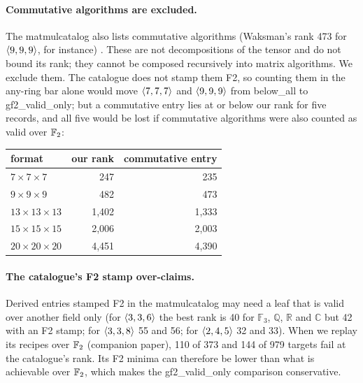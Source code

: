 \paragraph{Commutative algorithms are excluded.}
The matmulcatalog also lists commutative algorithms (Waksman's rank 473 for $\langle 9,9,9\rangle$, for instance) \cite{waksman1970winograd,winograd1968inner}. These are not decompositions of the tensor and do not bound its rank; they cannot be composed recursively into matrix algorithms. We exclude them. The catalogue does not stamp them F2, so counting them in the any-ring bar alone would move $\langle 7,7,7\rangle$ and $\langle 9,9,9\rangle$ from \textsf{below\_all} to \textsf{gf2\_valid\_only}; but a commutative entry lies at or below our rank for five records, and all five would be lost if commutative algorithms were also counted as valid over ${\mathbb{F}_2}$:
\begin{center}\small
\begin{tabular}{@{}lrr@{}}
\toprule
format & our rank & commutative entry\\\midrule
$7\times7\times7$ & 247 & 235\\
$9\times9\times9$ & 482 & 473\\
$13\times13\times13$ & 1{,}402 & 1{,}333\\
$15\times15\times15$ & 2{,}006 & 2{,}003\\
$20\times20\times20$ & 4{,}451 & 4{,}390\\
\bottomrule
\end{tabular}
\end{center}

\paragraph{The catalogue's F2 stamp over-claims.}
Derived entries stamped F2 in the matmulcatalog may need a leaf that is valid over another field only (for $\langle 3,3,6\rangle$ the best rank is 40 for $\mathbb F_3$, $\mathbb Q$, $\mathbb R$ and $\mathbb C$ but 42 with an F2 stamp; for $\langle 3,3,8\rangle$ 55 and 56; for $\langle 2,4,5\rangle$ 32 and 33).
When we replay its recipes over ${\mathbb{F}_2}$ (companion paper), 110 of 373 and 144 of 979 targets fail at the catalogue's rank. Its F2 minima can therefore be lower than what is achievable over ${\mathbb{F}_2}$, which makes the \textsf{gf2\_valid\_only} comparison conservative.
